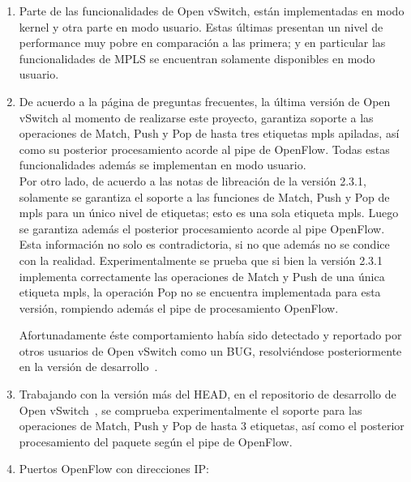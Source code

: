 \begin{enumerate}
\item Parte de las funcionalidades de Open vSwitch, est\'an implementadas en modo kernel y otra parte en modo usuario. Estas \'ultimas presentan un nivel de performance muy pobre en comparaci\'on a las primera; y en particular las funcionalidades de MPLS se encuentran solamente disponibles en modo usuario.

\item De acuerdo a la p\'agina de preguntas frecuentes, la \'ultima versi\'on de Open vSwitch al momento de realizarse este proyecto, garantiza soporte a las operaciones de Match, Push y Pop de hasta tres etiquetas mpls apiladas, as\'i como su posterior procesamiento acorde al pipe de OpenFlow. Todas estas funcionalidades adem\'as se implementan en modo usuario.\\

Por otro lado, de acuerdo  a las notas de libreaci\'on de la versi\'on 2.3.1, solamente se garantiza el soporte a las funciones de Match, Push y Pop de mpls para un \'unico nivel de etiquetas; esto es una sola etiqueta mpls. Luego se garantiza adem\'as el posterior procesamiento acorde al pipe OpenFlow.\\

Esta informaci\'on no solo es contradictoria, si no que adem\'as no se condice con la realidad. Experimentalmente se prueba que si bien la versi\'on 2.3.1 implementa correctamente las operaciones de Match y Push de una \'unica etiqueta mpls, la operaci\'on Pop no se encuentra implementada para esta versi\'on, rompiendo adem\'as el pipe de procesamiento OpenFlow. 

Afortunadamente \'este comportamiento hab\'ia sido detectado y reportado por otros usuarios de Open vSwitch como un BUG, resolviéndose posteriormente en la versi\'on de desarrollo~\citep{OVSSourceCode}.

\item Trabajando con la versi\'on m\'as del HEAD, en el repositorio de desarrollo de Open vSwitch~\citep{OVSSourceCode}, se comprueba experimentalmente el soporte para las operaciones de Match, Push y Pop de hasta 3 etiquetas, as\'i como el posterior procesamiento del paquete seg\'un el pipe de  OpenFlow.

\item Puertos OpenFlow con direcciones IP:
 

\end{enumerate}
